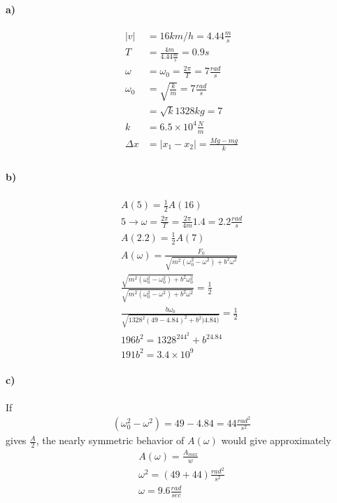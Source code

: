 \documentclass[10pt]{article}
\newcommand{\boxeq}[1]{%
  \begin{center}%
    \boxed{#1}%
  \end{center}%
}
\begin{document}
\paragraph{a)}
\label{par:a_}

\begin{align*}
  |v| &= 16km/h=4.44\frac{m}{s}\\
  T&=\frac{4m}{4.44\frac{m}{s}} = 0.9s\\
  \omega &= \omega_0=\frac{2\pi}{T}=7\frac{rad}{s}\\
  \omega_0&=\sqrt{\frac{k}{m}} = 7\frac{rad}{s}\\
          &=\sqrt{k}{1328kg} = 7\\
  k &= 6.5\times 10^4 \frac{N}{m}\\
  \Delta x &= |x_1-x_2|=\frac{Mg-mg}{k}\\
\end{align*}

\boxeq{\Delta x = 5cm}

\paragraph{b)}
\label{par:b_}

\begin{align*}
  A(5)=\frac{1}{2}A(16)\\
  5\rightarrow \omega = \frac{2\pi}{T}=\frac{2\pi}{4m}1.4=2.2\frac{rad}{s}\\
  A(2.2)=\frac{1}{2}A(7)\\
  A(\omega)=\frac{F_0}{\sqrt{m^2\left(\omega_0^2-\omega^2\right)+b^2\omega^2}}\\
  \frac{\sqrt{m^2\left(\omega_0^2-\omega^2_0\right)+b^2\omega_0^2}}{\sqrt{m^2\left(\omega_0^2-\omega^2\right)+b^2\omega^2}}
  = \frac{1}{2}\\
  \frac{b\omega_0}{\sqrt{1328^2(49-4.84)^2+b^2)4.84)}} = \frac{1}{2}\\
  196b^2=1328^244^2+b^24.84\\
  191b^2=3.4\times 10^9
\end{align*}

\boxeq{b=4.2\times 10^3\frac{kg}{s}}

\paragraph{c)}
\label{par:c_}

If
\begin{align*}
  \left(\omega_0^2-\omega^2\right) = 49-4.84=44\frac{rad^2}{s^2}
\end{align*}
gives $\frac{A}{2}$, the nearly symmetric behavior of $A(\omega)$ would give
approximately
\begin{align*}
  A(\omega) = \frac{A_{max}}{w}\\
  \omega^2=(49+44)\frac{rad^2}{s^2}\\
  \omega=9.6\frac{rad}{sec}
\end{align*}
\end{document}
